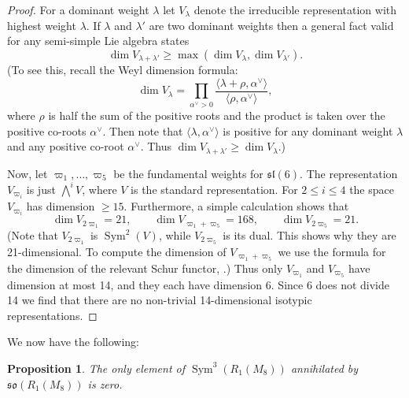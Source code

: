 \documentclass{amsart}
\newcommand{\cut}[1]{}
\newtheorem{proposition}[theorem]{Proposition}
\theoremstyle{definition}
\theoremstyle{remark}
\DeclareMathOperator{\Sym}{Sym}
\def\cubic{\mathcal{C}}
\let\mf\mathfrak
\begin{document}
\begin{proof}
For a dominant weight $\lambda$ let $V_{\lambda}$ denote the irreducible representation with highest weight $\lambda$.
If $\lambda$ and $\lambda'$ are two dominant weights then a general fact valid for any semi-simple Lie algebra states
\begin{displaymath}
\dim{V_{\lambda+\lambda'}} \ge \max(\dim{V_{\lambda}}, \dim{V_{\lambda'}}).
\end{displaymath}
(To see this, recall the Weyl dimension formula:
\begin{displaymath}
\dim{V_{\lambda}}=\prod_{\alpha^{\vee}>0} \frac{\langle \lambda+\rho, \alpha^{\vee} \rangle}{\langle \rho,
\alpha^{\vee} \rangle},
\end{displaymath}
where $\rho$ is half the sum of the positive roots and the product is taken over the positive co-roots $\alpha^{\vee}$.
Then note that $\langle \lambda, \alpha^{\vee} \rangle$ is positive for any dominant weight $\lambda$ and any positive
co-root $\alpha^{\vee}$.  Thus $\dim{V_{\lambda+\lambda'}} \ge \dim{V_{\lambda}}$.)

Now, let $\varpi_1, \ldots, \varpi_5$ be the fundamental weights for $\mf{sl}(6)$.  The representation $V_{\varpi_i}$
is just $\bigwedge^i V$, where $V$ is the standard representation.  For $2 \le i \le 4$ the space $V_{\varpi_i}$ has
dimension $\ge 15$.  Furthermore, a simple calculation shows that
\begin{displaymath}
\dim{V_{2 \varpi_1}}=21, \qquad \dim{V_{\varpi_1+\varpi_5}}=168, \qquad \dim{V_{2 \varpi_5}}=21.
\end{displaymath}
(Note that $V_{2 \varpi_1}$ is $\Sym^2(V)$, while $V_{2 \varpi_5}$ is its dual.  This shows why they are 21-dimensional.
To compute the dimension of $V_{\varpi_1+\varpi_5}$ we use the formula for the dimension of the relevant Schur functor,
\cite[Ex.~6.4]{FH}.) Thus only $V_{\varpi_1}$ and $V_{\varpi_5}$ have dimension at most 14, and they each have
dimension 6.  Since 6 does not divide 14 we find that there are no non-trivial 14-dimensional isotypic representations.
\end{proof}

We now have the following:

\begin{proposition}
\label{prop:so-ann}
The only element of $\Sym^3(R_1(M_8))$ annihilated by $\mf{so}(R_1(M_8))$ is zero.
\end{proposition}

\cut{I changed $\cubic$ to $s$ in the following proof, since we're not using \emph{the} cubic.}
\end{document}

